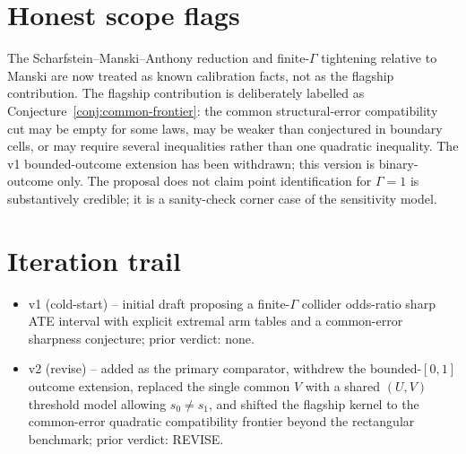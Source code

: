 \documentclass[11pt]{article}
\theoremstyle{definition}
\theoremstyle{plain}
\theoremstyle{remark}
\begin{document}
\section{Honest scope flags}
The Scharfstein--Manski--Anthony reduction and finite-\(\Gamma\) tightening relative to Manski are now treated as known calibration facts, not as the flagship contribution.  The flagship contribution is deliberately labelled as Conjecture~\ref{conj:common-frontier}: the common structural-error compatibility cut may be empty for some laws, may be weaker than conjectured in boundary cells, or may require several inequalities rather than one quadratic inequality.  The v1 bounded-outcome extension has been withdrawn; this version is binary-outcome only.  The proposal does not claim point identification for \(\Gamma=1\) is substantively credible; it is a sanity-check corner case of the sensitivity model.

\section{Iteration trail}
\begin{itemize}[leftmargin=*]
\item v1 (cold-start) -- initial draft proposing a finite-\(\Gamma\) collider odds-ratio sharp ATE interval with explicit extremal arm tables and a common-error sharpness conjecture; prior verdict: none.
\item v2 (revise) -- added \citet{ScharfsteinManskiAnthony2004Bounds} as the primary comparator, withdrew the bounded-\([0,1]\) outcome extension, replaced the single common \(V\) with a shared \((U,V)\) threshold model allowing \(s_0\ne s_1\), and shifted the flagship kernel to the common-error quadratic compatibility frontier beyond the rectangular benchmark; prior verdict: REVISE.
\end{itemize}
\end{document}
